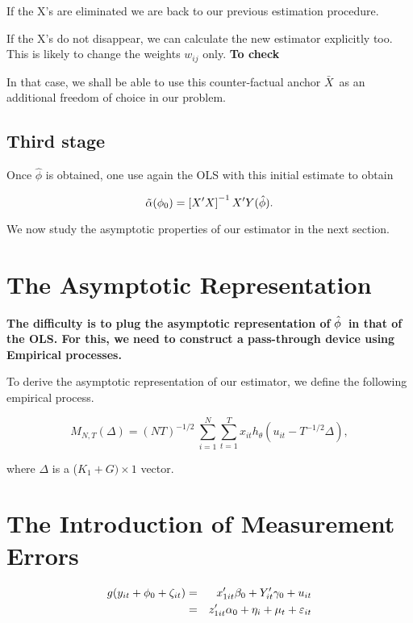 \documentclass[a4paper,notitlepage,thmsb,11pt]{article}
\begin{document}
If the X's are eliminated we are back to our previous estimation procedure.

If the X's do not disappear, we can calculate the new estimator explicitly
too. This is likely to change the weights $w_{ij}$ only. \textbf{To check}

In that case, we shall be able to use this counter-factual anchor $\bar{X}$\
as an additional freedom of choice in our problem.

\subsection{Third stage}

Once $\hat{\phi}$ is obtained, one use again the OLS with this initial
estimate to obtain

\begin{equation*}
\tilde{\alpha}(\phi _{0})=\left[ X^{\prime }X\right] ^{-1}X^{\prime }Y(\hat{%
\phi}).
\end{equation*}

We now study the asymptotic properties of our estimator in the next section.

\section{The Asymptotic Representation}

\textbf{The difficulty is to plug the asymptotic representation of }$\hat{%
\phi}$\textbf{\ in that of the OLS. For this, we need to construct a
pass-through device using Empirical processes.}

To derive the asymptotic representation of our estimator, we define the
following empirical process.

\begin{equation*}
M_{N,T}(\Delta
)=(NT)^{-1/2}~\sum\limits_{i=1}^{N}\sum_{t=1}^{T}x_{it}h_{\theta
}(u_{it}-T^{-1/2}\Delta ),
\end{equation*}

where $\Delta $ is a ($K_{1}+G)\times 1$ vector. 

\section{The Introduction of Measurement Errors}

\begin{eqnarray}
g(y_{it}+\phi _{0}+\zeta _{it}) &=&x_{1it}^{\prime }\beta
_{0}+Y_{it}^{\prime }\gamma _{0}+u_{it} \\
&=&z_{1it}^{\prime }\alpha _{0}+\eta _{i}+\mu _{t}+\varepsilon _{it}  \notag
\end{eqnarray}
\end{document}
